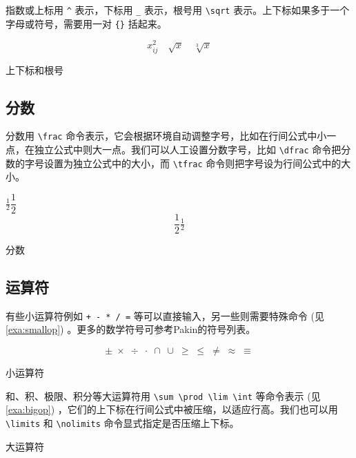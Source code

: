 指数或上标用 \verb|^| 表示，下标用 \verb|_| 表示，根号用 \verb|\sqrt| 表示。上下标如果多于一个字母或符号，需要用一对 \verb|{}| 括起来。

\begin{example}[h]
\begin{BTDemo}[]
\[ x_{ij}^2\quad \sqrt{x}\quad \sqrt[3]{x} \]
\end{BTDemo}
\caption{上下标和根号}
\end{example}

\subsection{分数}

分数用 \verb|\frac| 命令表示，它会根据环境自动调整字号，比如在行间公式中小一点，在独立公式中则大一点。我们可以人工设置分数字号，比如 \verb|\dfrac| 命令把分数的字号设置为独立公式中的大小，而 \verb|\tfrac| 命令则把字号设为行间公式中的大小。

\begin{example}[h]
\begin{RLDemo}[]
$ \frac{1}{2} \dfrac{1}{2} $
\[ \frac{1}{2} 
  \tfrac{1}{2} \]
\end{RLDemo}
\caption{分数}
\end{example}

\subsection{运算符}

有些小运算符例如 \verb|+ - * / =| 等可以直接输入，另一些则需要特殊命令 (见 \autoref{exa:smallop}) 。更多的数学符号可参考Pakin\indexPakin 的符号列表\citep{Pakin_comprehensive}。

\begin{example}[h]
\begin{BTDemo}[]
\[ \pm\; \times\; \div\; \cdot\; \cap\; \cup\; 
  \geq\; \leq\; \neq\; \approx\; \equiv \]
\end{BTDemo}
\caption{小运算符}
\label{exa:smallop}
\end{example}

和、积、极限、积分等大运算符用 \verb|\sum \prod \lim \int| 等命令表示 (见 \autoref{exa:bigop}) ，它们的上下标在行间公式中被压缩，以适应行高。我们也可以用 \verb|\limits| 和 \verb|\nolimits| 命令显式指定是否压缩上下标。

\begin{example}[h]
\caption{大运算符}
\label{exa:bigop}
\end{example}


